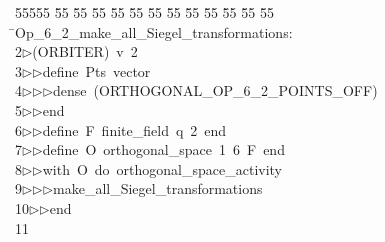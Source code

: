 %
%
\begin{tabbing}
55555 \= 55 \= 55 \= 55 \= 55 \= 55 \= 55 \= 55 \= 55 \= 55 \= 55 \= 55 \= 55 \= \>Op\_6\_2\_make\_all\_Siegel\_transformations:\\[0pt]
2\>$\triangleright$\>(ORBITER)\ v\ 2\ \\[0pt]
3\>$\triangleright$\>$\triangleright$\>define\ Pts\ vector\ \\[0pt]
4\>$\triangleright$\>$\triangleright$\>$\triangleright$\>dense\ (ORTHOGONAL\_OP\_6\_2\_POINTS\_OFF)\ \\[0pt]
5\>$\triangleright$\>$\triangleright$\>end\ \\[0pt]
6\>$\triangleright$\>$\triangleright$\>define\ F\ finite\_field\ q\ 2\ end\ \\[0pt]
7\>$\triangleright$\>$\triangleright$\>define\ O\ orthogonal\_space\ 1\ 6\ F\ end\ \\[0pt]
8\>$\triangleright$\>$\triangleright$\>with\ O\ do\ orthogonal\_space\_activity\ \\[0pt]
9\>$\triangleright$\>$\triangleright$\>$\triangleright$\>make\_all\_Siegel\_transformations\ \\[0pt]
10\>$\triangleright$\>$\triangleright$\>end\\[0pt]
11\>\end{tabbing}
